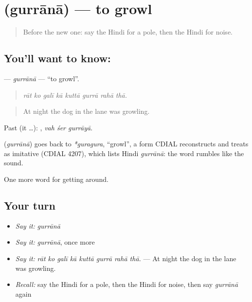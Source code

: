 \section[\texorpdfstring{\hi{गुर्राना} (gurrānā)}{गुर्राना (gurrānā)}]{ (gurrānā) — to growl}

\label{lesson:HI-C423-gurrana}



\begin{quote}
Before the new one: say the Hindi for a pole, then the Hindi for noise.
\end{quote}

\subsection*{You'll want to know: }
\textbf{} — \emph{gurrānā} — \textquotedblleft{}to growl\textquotedblright{}.

\begin{quote}
       
\end{quote}

\begin{quote}
\emph{rāt ko galī kā kuttā gurrā rahā thā.}
\end{quote}

\begin{quote}
At night the dog in the lane was growling.
\end{quote}

Past (it …):   , \emph{vah śer gurrāyā}.

\begin{cousinweb}
\textbf{} (\emph{gurrānā}) goes back to \emph{*guragura}, \textquotedblleft{}growl\textquotedblright{}, a form CDIAL reconstructs and treats as imitative (CDIAL 4207), which lists Hindi \emph{gurrānā}: the word rumbles like the sound.
\end{cousinweb}

\begin{grammarlens}[title={What you've built}]
One more word for getting around.
\end{grammarlens}

\subsection*{Your turn}
\begin{itemize}
\raggedright
  \item \emph{Say it:} \emph{gurrānā}
  \item \emph{Say it:} \emph{gurrānā}, once more
  \item \emph{Say it:} \emph{rāt ko galī kā kuttā gurrā rahā thā.} — At night the dog in the lane was growling.
  \item \emph{Recall:} say the Hindi for a pole, then the Hindi for noise, then say \emph{gurrānā} again
\end{itemize}


